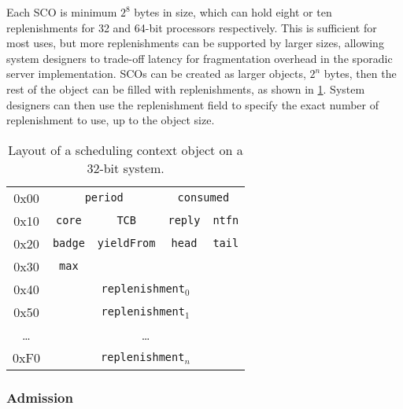 Each \gls{SCO} is minimum $2^{8}$ bytes in size, which can hold eight or ten replenishments for 32
and 64-bit processors respectively. This is sufficient for most uses, but more replenishments can
be supported by larger sizes, allowing system designers to trade-off latency for fragmentation
overhead in the sporadic server implementation. \glspl{SCO} can be created as larger
objects, $2^{n}$ bytes, then the rest of the object can be filled with replenishments, as
shown in \cref{t:impl-sc-layout}. System designers can then use the  replenishment field
to specify the exact number of replenishment to use, up to the object size. 

\begin{table}[t] 
    \centering
    \begin{tabular}{c|c|c|c|c|}\cline{2-5}
        0x00 &  \multicolumn{2}{c}{\texttt{period}} & \multicolumn{2}{|c|}{\texttt{consumed}}
        \\\cline{2-5}
        0x10 & \texttt{core}                         & \texttt{TCB} & \texttt{reply} & \texttt{ntfn} \\\cline{2-5}
        0x20 &\texttt{badge}                        & \texttt{yieldFrom}                               & \texttt{head}  & \texttt{tail} \\\cline{2-5}
        0x30 & \texttt{max}                          &                                                  &                & \\\cline{2-5}
        0x40 & \multicolumn{4}{c|}{\texttt{replenishment$_{0}$}}  \\\cline{2-5}
        0x50 & \multicolumn{4}{c|}{\texttt{replenishment$_{1}$}}  \\\cline{2-5}
        \ldots & \multicolumn{4}{c|}{\ldots}  \\\cline{2-5}
        0xF0 & \multicolumn{4}{c|}{\texttt{replenishment$_{n}$}}  \\\cline{2-5}


    \end{tabular}
    \caption[Layout of a scheduling context object.]{Layout of a scheduling context object on a 32-bit system.}
    \label{t:impl-sc-layout}
\end{table}

\subsubsection{Admission}

